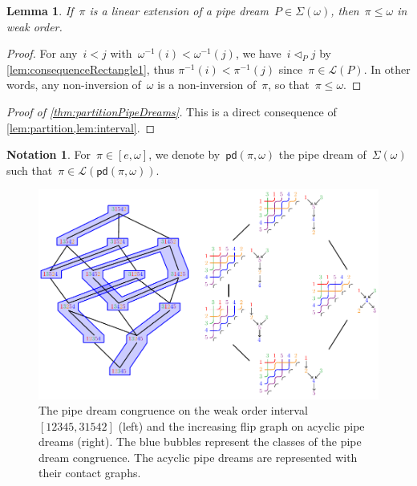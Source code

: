 \documentclass[reqno]{amsart}
\newtheorem{lemma}[theorem]{Lemma}
\theoremstyle{definition}
\newtheorem{notation}[theorem]{Notation}
\newcommand{\acyclicPipeDreams}{\Sigma} %
\newcommand{\linearExtensions}{\mathcal{L}} %
\newcommand{\insertion}[2]{\mathsf{pd}(#1,#2)} %
\newcommand{\less}{\vartriangleleft} %
\newcommand{\contactLess}[1]{\less_{#1}} %
\begin{document}
\begin{lemma}
\label{lem:interval}
If~$\pi$ is a linear extension of a pipe dream~$P \in \acyclicPipeDreams(\omega)$, then~$\pi \le \omega$ in weak order.
\end{lemma}

\begin{proof}
For any~$i < j$ with~$\omega^{-1}(i) < \omega^{-1}(j)$, we have~$i \contactLess{P} j$ by \cref{lem:consequenceRectangle1}, thus ${\pi^{-1}(i) < \pi^{-1}(j)}$ since~$\pi \in \linearExtensions(P)$.
In other words, any non-inversion of~$\omega$ is a non-inversion of~$\pi$, so that~${\pi \le \omega}$.
\end{proof}

\begin{proof}[Proof of \cref{thm:partitionPipeDreams}]
This is a direct consequence of \cref{lem:partition,lem:interval}.
\end{proof}

\begin{notation}
For~$\pi \in [e, \omega]$, we denote by~$\insertion{\pi}{\omega}$ the pipe dream of~$\acyclicPipeDreams(\omega)$ such that~${\pi \in \linearExtensions(\insertion{\pi}{\omega})}$.
\end{notation}

\begin{figure}
	\centerline{\includegraphics[scale=1]{latticeAcyclicPipeDreams}}
	\caption{The pipe dream congruence on the weak order interval~$[12345, 31542]$ (left) and the increasing flip graph on acyclic pipe dreams (right). The blue bubbles represent the classes of the pipe dream congruence. The acyclic pipe dreams are represented with their contact graphs.}
	\label{fig:latticeAcyclicPipeDreams}
\end{figure}
\end{document}
